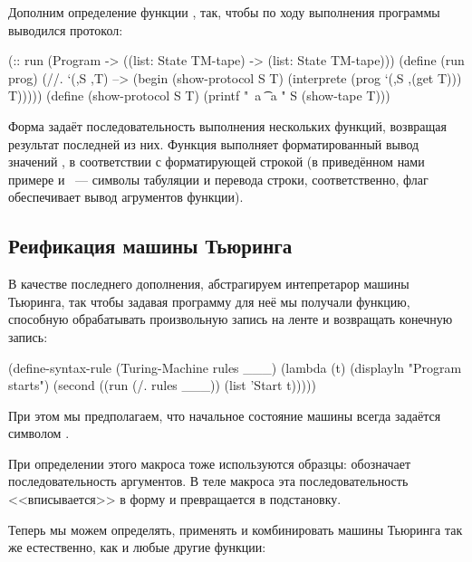 Дополним определение функции , так, чтобы по ходу выполнения программы выводился протокол:
\begin{Definition}[emph={S,T,prog}]
(:: run (Program -> ((list: State TM-tape) -> 
                     (list: State TM-tape)))
 (define (run prog)
   (//. `(,S ,T) --> (begin
                       (show-protocol S T)
                       (interprete (prog `(,S ,(get T))) T)))))%
(define (show-protocol S T)
  (printf "~a \t ~a \n" S (show-tape T)))
\end{Definition}

Форма  задаёт последовательность выполнения нескольких функций, возвращая результат последней из них. Функция  выполняет форматированный вывод значений , в соответствии с форматирующей строкой  (в приведённом нами примере  и ~--- символы табуляции и перевода строки, соответственно, флаг  обеспечивает вывод агрументов функции).

\subsection*{Реификация машины Тьюринга}
В качестве последнего дополнения, абстрагируем интепретарор машины Тьюринга, так чтобы задавая программу для неё мы получали функцию, способную обрабатывать произвольную запись на ленте и возвращать конечную запись:

\begin{Definition}[emph={l,rules}]
(define-syntax-rule (Turing-Machine rules ___)
  (lambda (t)
    (displayln "Program starts")
    (second ((run (/. rules ___)) (list 'Start t)))))
\end{Definition}

\noindent При этом мы предполагаем, что начальное состояние машины всегда задаётся символом . 

При определении этого макроса тоже используются образцы:  обозначает последовательность аргументов. В теле макроса эта последовательность <<вписывается>> в форму  и превращается в подстановку.

Теперь мы можем определять, применять и комбинировать машины Тьюринга так же естественно, как и любые другие функции:

